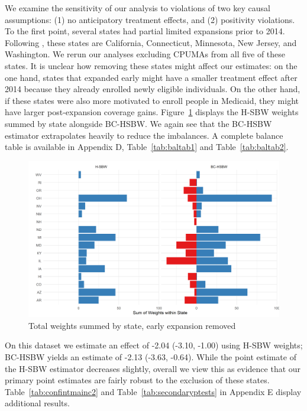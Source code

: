 \documentclass[aoas]{imsart}
\theoremstyle{plain}
\theoremstyle{remark}
\begin{document}
We examine the sensitivity of our analysis to violations of two key causal assumptions: (1) no anticipatory treatment effects, and (2) positivity violations. To the first point, several states had partial limited expansions prior to 2014. Following \cite{frean2017premium}, these states are California, Connecticut, Minnesota, New Jersey, and Washington. We rerun our analyses excluding CPUMAs from all five of these states. It is unclear how removing these states might affect our estimates: on the one hand, states that expanded early might have a smaller treatment effect after 2014 because they already enrolled newly eligible individuals. On the other hand, if these states were also more motivated to enroll people in Medicaid, they might have larger post-expansion coverage gains. Figure~\ref{fig:weightsbystatec2} displays the H-SBW weights summed by state alongside BC-HSBW. We again see that the BC-HSBW estimator extrapolates heavily to reduce the imbalances. A complete balance table is available in Appendix D, Table~\ref{tab:baltab1} and Table~\ref{tab:baltab2}.

\begin{figure}
\begin{center}
    \caption{Total weights summed by state, early expansion removed}
    \label{fig:weightsbystatec2}
    \includegraphics[scale=0.6]{01_Plots/weights-by-state-hsbw-c2.png}
\end{center}
\end{figure}

On this dataset we estimate an effect of -2.04 (-3.10, -1.00) using H-SBW weights; BC-HSBW yields an estimate of -2.13 (-3.63, -0.64). While the point estimate of the H-SBW estimator decreases slightly, overall we view this as evidence that our primary point estimates are fairly robust to the exclusion of these states. Table~\ref{tab:confintmainc2} and Table~\ref{tab:secondaryptests} in Appendix E display additional results. 
\end{document}
